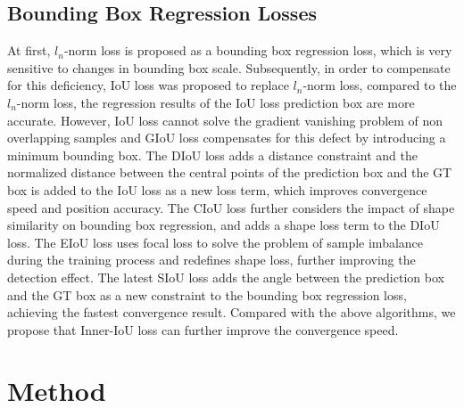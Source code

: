 \documentclass[lettersize,journal]{IEEEtran}
\begin{document}
	\subsection{Bounding Box Regression Losses}
	At first,  $\textit{l}_n$-norm loss\cite{ref14} is proposed as a bounding box regression loss, which is very sensitive to changes in bounding box scale. Subsequently, in order to compensate for this deficiency, IoU loss\cite{ref1} was proposed to replace $\textit{l}_n$-norm loss, compared to the $\textit{l}_n$-norm loss, the regression results of the IoU loss\cite{ref1} prediction box are more accurate. However, IoU loss cannot solve the gradient vanishing problem of non overlapping samples and GIoU loss\cite{ref2} compensates for this defect by introducing a minimum bounding box. The DIoU loss\cite{ref3} adds a distance constraint and the normalized distance between the central points of the prediction box and the GT box is added to the IoU loss as a new loss term, which improves convergence speed and position accuracy. The CIoU loss\cite{ref3} further considers the impact of shape similarity on bounding box regression, and adds a shape loss term to the DIoU loss. The EIoU loss\cite{ref4} uses focal loss to solve the problem of sample imbalance during the training process and redefines shape loss, further improving the detection effect. The latest SIoU\cite{ref5} loss adds the angle between the prediction box and the GT box as a new constraint to the bounding box regression loss, achieving the fastest convergence result. Compared with the above algorithms, we propose that Inner-IoU loss can further improve the convergence speed.
	\section{Method}
\end{document}
